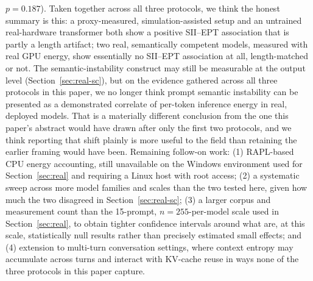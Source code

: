 \documentclass[conference]{IEEEtran}
\begin{document}
$p=0.187$). Taken together across all three protocols, we think the
honest summary is this: a proxy-measured, simulation-assisted setup
and an untrained real-hardware transformer both show a positive
SII--EPT association that is partly a length artifact; two real,
semantically competent models, measured with real GPU energy, show
essentially no SII--EPT association at all, length-matched or not.
The semantic-instability construct may still be measurable at the
output level (Section~\ref{sec:real-sc}), but on the evidence gathered
across all three protocols in this paper, we no longer think prompt
semantic instability can be presented as a demonstrated correlate of
per-token inference energy in real, deployed models. That is a
materially different conclusion from the one this paper's abstract
would have drawn after only the first two protocols, and we think
reporting that shift plainly is more useful to the field than
retaining the earlier framing would have been.
Remaining follow-on work: (1) RAPL-based CPU energy accounting, still
unavailable on the Windows environment used for Section~\ref{sec:real}
and requiring a Linux host with root access; (2) a systematic sweep
across more model families and scales than the two tested here, given
how much the two disagreed in Section~\ref{sec:real-sc}; (3) a larger
corpus and measurement count than the 15-prompt, $n=255$-per-model
scale used in Section~\ref{sec:real}, to obtain tighter confidence
intervals around what are, at this scale, statistically null results
rather than precisely estimated small effects; and (4) extension to
multi-turn conversation settings, where context entropy may
accumulate across turns and interact with KV-cache reuse in ways none
of the three protocols in this paper capture.
\balance
\end{document}
